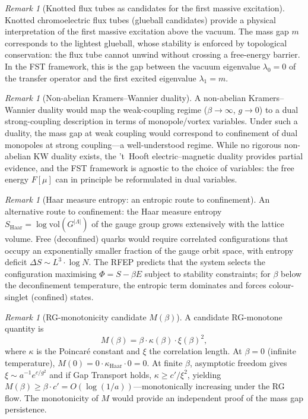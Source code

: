 \documentclass[12pt,a4paper]{article}
\theoremstyle{definition}
\theoremstyle{plain}
\theoremstyle{remark}
\newtheorem{remark}[definition]{Remark}
\begin{document}
\begin{remark}[Knotted flux tubes as candidates for the first massive excitation]
\label{rem:knotted-flux}
Knotted chromoelectric flux tubes (glueball candidates) provide a physical interpretation of the first massive excitation above the vacuum. The mass gap $m$ corresponds to the lightest glueball, whose stability is enforced by topological conservation: the flux tube cannot unwind without crossing a free-energy barrier. In the FST framework, this is the gap between the vacuum eigenvalue $\lambda_0 = 0$ of the transfer operator and the first excited eigenvalue $\lambda_1 = m$.
\end{remark}

\begin{remark}[Non-abelian Kramers--Wannier duality]
\label{rem:non-abelian-kw}
A non-abelian Kramers--Wannier duality would map the weak-coupling regime ($\beta \to \infty$, $g \to 0$) to a dual strong-coupling description in terms of monopole/vortex variables. Under such a duality, the mass gap at weak coupling would correspond to confinement of dual monopoles at strong coupling---a well-understood regime. While no rigorous non-abelian KW duality exists, the 't~Hooft electric--magnetic duality provides partial evidence, and the FST framework is agnostic to the choice of variables: the free energy $F[\mu]$ can in principle be reformulated in dual variables.
\end{remark}

\begin{remark}[Haar measure entropy: an entropic route to confinement]
\label{rem:haar-entropy}
An alternative route to confinement: the Haar measure entropy $S_{\mathrm{Haar}} = \log \mathrm{vol}(G^{|\Lambda|})$ of the gauge group grows extensively with the lattice volume. Free (deconfined) quarks would require correlated configurations that occupy an exponentially smaller fraction of the gauge orbit space, with entropy deficit $\Delta S \sim L^3 \cdot \log N$. The RFEP predicts that the system selects the configuration maximising $\Phi = S - \beta E$ subject to stability constraints; for $\beta$ below the deconfinement temperature, the entropic term dominates and forces colour-singlet (confined) states.
\end{remark}

\begin{remark}[RG-monotonicity candidate $M(\beta)$]
\label{rem:rg-monotone}
A candidate RG-monotone quantity is
\[
M(\beta) = \beta \cdot \kappa(\beta) \cdot \xi(\beta)^2,
\]
where $\kappa$ is the Poincar\'e constant and $\xi$ the correlation length. At $\beta = 0$ (infinite temperature), $M(0) = 0 \cdot \kappa_{\mathrm{Haar}} \cdot 0 = 0$. At finite $\beta$, asymptotic freedom gives $\xi \sim a^{-1} e^{c/g^2}$ and if Gap Transport holds, $\kappa \geq c'/\xi^2$, yielding $M(\beta) \geq \beta \cdot c' = O(\log(1/a))$---monotonically increasing under the RG flow. The monotonicity of $M$ would provide an independent proof of the mass gap persistence.
\end{remark}
\end{document}
